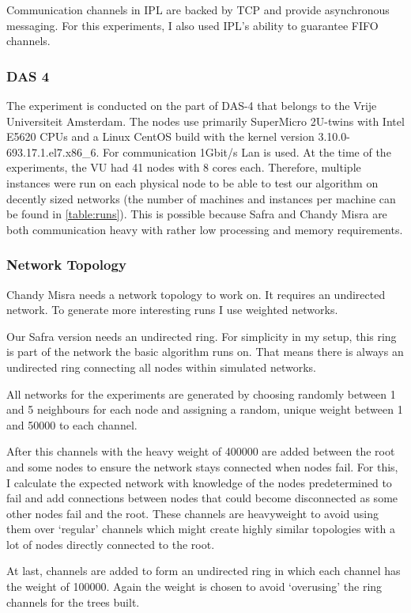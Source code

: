 Communication channels in IPL are backed by TCP and provide asynchronous messaging.
For this experiments, I also used IPL's ability to guarantee FIFO channels.

\subsubsection{DAS 4}
The experiment is conducted on the part of DAS-4 that belongs to the Vrije Universiteit Amsterdam.
The nodes use primarily SuperMicro 2U-twins with Intel E5620 CPUs and a Linux CentOS build with the kernel version 3.10.0-693.17.1.el7.x86\_6.
For communication 1Gbit/s Lan is used.
At the time of the experiments, the VU had 41 nodes with 8 cores each.
Therefore, multiple instances were run on each physical node to be able to test our algorithm on decently sized networks (the number of machines and instances per machine can be found in \cref{table:runs}).
This is possible because Safra and Chandy Misra are both communication heavy with rather low processing and memory requirements.

\newpage
\subsubsection{Network Topology}
Chandy Misra needs a network topology to work on.
It requires an undirected network.
To generate more interesting runs I use weighted networks.

Our Safra version needs an undirected ring.
For simplicity in my setup, this ring is part of the network the basic algorithm runs on.
That means there is always an undirected ring connecting all nodes within simulated networks.

All networks for the experiments are generated by choosing randomly between 1 and 5 neighbours for each node and assigning a random, unique weight between 1 and 50000 to each channel.

After this channels with the heavy weight of 400000 are added between the root and some nodes to ensure the network stays connected when nodes fail.
For this, I calculate the expected network with knowledge of the nodes predetermined to fail and add connections between nodes that could become disconnected as some other nodes fail and the root.
These channels are heavyweight to avoid using them over `regular' channels which might create highly similar topologies with a lot of nodes directly connected to the root.

At last, channels are added to form an undirected ring in which each channel has the weight of 100000.
Again the weight is chosen to avoid `overusing' the ring channels for the trees built.

